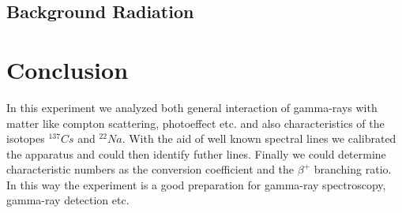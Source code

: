 \documentclass[bigchapter,colorback,accentcolor=tud4b,linedtoc,11pt]{tudreport}
\begin{document}
\begin{center}
\begin{figure}[H]
\end{figure}
\end{center}

\section{Background Radiation}

\begin{center}
\begin{figure}[H]
\end{figure}
\end{center}

\chapter{Conclusion}

In this experiment we analyzed both general interaction of gamma-rays with
matter like compton scattering, photoeffect etc. and also characteristics of the
isotopes $^{137}Cs$ and $^{22}Na$. With the aid of well known spectral lines we
calibrated the apparatus and could then identify futher lines. Finally we could
determine characteristic numbers as the conversion coefficient and the $\beta^+$
branching ratio. In this way the experiment is a good preparation for gamma-ray
spectroscopy, gamma-ray detection etc.
\end{document}
